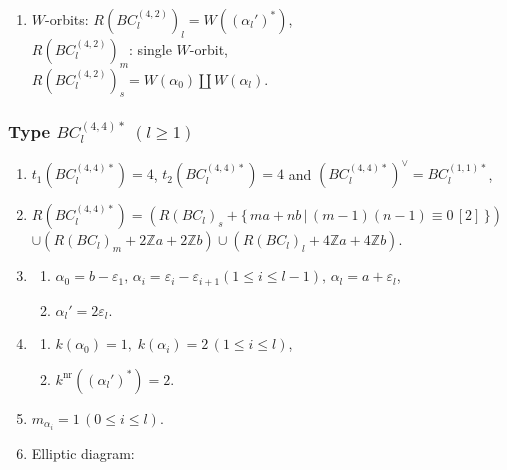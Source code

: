 \documentclass[11pt]{amsart}
\newcommand{\Z}{\mathbb{Z}}
\newcommand{\nr}{\mathrm{nr}}
\newcommand{\vep}{\varepsilon}
\begin{document}
{\begin{enumerate}
\begin{center}
{}
\end{center}


\item $W$-orbits:  $R(BC_l^{(4,2)})_l=W((\alpha_l')^\ast)$, \\ 
\phantom{$W$-orbits:} $R(BC_l^{(4,2)})_m$: single $W$-orbit,  \\
\phantom{$W$-orbits:} $R(BC_l^{(4,2)})_s=W(\alpha_0) \amalg W(\alpha_l)$.
\end{enumerate}

\subsubsection{Type $BC_l^{(4,4)\ast}\; (l\geq 1)$}\label{data:BC-4}
\begin{enumerate}
\item $t_1(BC_l^{(4,4)\ast})=4$, \; $t_2(BC_l^{(4,4)\ast})=4$ and  
$(BC_l^{(4,4)\ast})^\vee=BC_l^{(1,1)\ast}$,
\item $R(BC_l^{(4,4)\ast})=(R(BC_l)_s+\{\, ma+nb\, \vert\, (m-1)(n-1)\equiv 0\, [2]\, \})$ \\
 $\cup (R(BC_l)_m+2\Z a+2\Z b) \cup (R(BC_l)_l+4\Z a+4\Z b)$. 
\item 
\begin{enumerate}
\item[i)] $\alpha_0=b-\vep_1, \, \alpha_i=\vep_i-\vep_{i+1} 
(1\leq i\leq l-1), \, \alpha_l=a+\vep_l$,
\item[ii)] $\alpha_l'=2\vep_l$.
\end{enumerate}
\item 
\begin{enumerate}
\item[i)] $k(\alpha_0)=1, \; k(\alpha_i)=2\,  (1\leq i\leq l)$, 
\item[ii)] $k^{\nr}((\alpha_l')^\ast)=2$. 
\end{enumerate}
\item $m_{\alpha_i}=1\, (0\leq i\leq l)$.
\item Elliptic diagram:
\begin{center}
\scalebox{0.85}{
\begin{tikzpicture}[scale=0.9]


\end{tikzpicture}}
\end{center}
\end{enumerate}}
\end{document}
